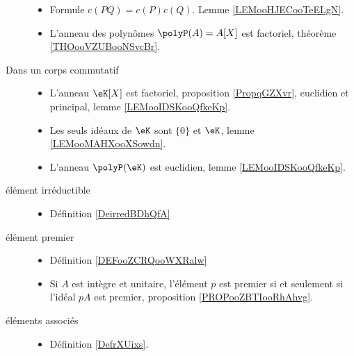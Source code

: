 \begin{description}
\begin{itemize}
		      \item
		            Formule \( c(PQ)=c(P)c(Q)\). Lemme \ref{LEMooHJECooTeELgN}.
		      \item
		            L'anneau des polynômes \( \polyP(A)=A[X]\) est factoriel, théorème \ref{THOooVZUBooNSvcBr}.
	      \end{itemize}
	\item[Dans un corps commutatif]\hspace{1cm}
	      \begin{itemize}
		      \item
		            L'anneau \( \eK[X]\) est factoriel, proposition \ref{PropqGZXvr}, euclidien et principal, lemme \ref{LEMooIDSKooQfkeKp}.
		      \item
		            Les seuls idéaux de \( \eK\) sont \( \{ 0 \}\) et \( \eK\), lemme \ref{LEMooMAHXooXSowdn}.
		      \item
		            L'anneau \( \polyP(\eK)\) est euclidien, lemme \ref{LEMooIDSKooQfkeKp}.
	      \end{itemize}
\end{description}

\begin{description}
	\item[élément irréductible]\hspace{1cm}
	      \begin{itemize}
		      \item Définition \ref{DeirredBDhQfA}
	      \end{itemize}
	\item[élément premier]\hspace{1cm}
	      \begin{itemize}
		      \item Définition \ref{DEFooZCRQooWXRalw}
		      \item
		            Si \( A\) est intègre et unitaire, l'élément \( p\) est premier si et seulement si l'idéal \( pA\) est premier, proposition \ref{PROPooZBTIooRhAhvg}.
	      \end{itemize}
	\item[éléments associés]\hspace{1cm}
	      \begin{itemize}
		      \item Définition \ref{DefrXUixs}.
	      \end{itemize}
\end{description}

